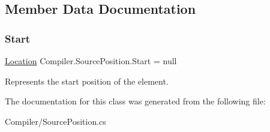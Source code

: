 \subsection{Member Data Documentation}
\mbox{\label{class_compiler_1_1_source_position_ad7c78fd184a393fc62cb5ee8678db0c8}} 
\subsubsection{\texorpdfstring{Start}{Start}}
{\footnotesize\ttfamily \mbox{\hyperlink{class_compiler_1_1_location}{Location}} Compiler.\+Source\+Position.\+Start = null}

Represents the start position of the element. 

The documentation for this class was generated from the following file\+:\begin{DoxyCompactItemize}
\item 
Compiler/Source\+Position.\+cs\end{DoxyCompactItemize}
